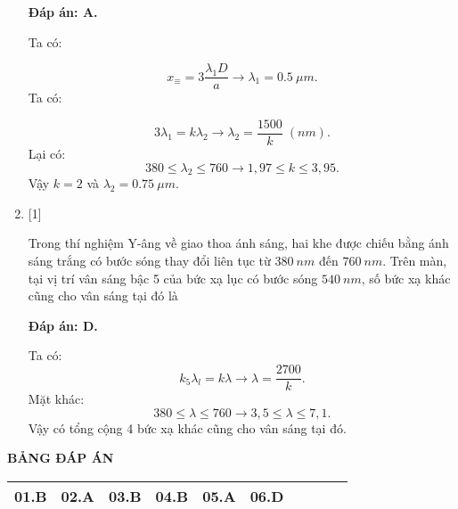 \begin{enumerate}[label=\bfseries Câu \arabic*:]
\loigiai
{		\textbf{Đáp án: A.}
	
	Ta có:
	
	$$
	x_{\equiv} = 3 \dfrac{\lambda_{1} D}{a} \rightarrow \lambda_{1} = \SI{0,5}{\mu m}.
	$$
	Ta có:
	
	$$
	3 \lambda_{1} = k \lambda_{2} \rightarrow \lambda_{2} = \dfrac{1500}{k} \; (\si{nm}).
	$$
	Lại có:
	$$
	380 \leq \lambda_{2} \leq 760 \rightarrow 1,97 \leq k \leq 3,95.
	$$
	Vậy $k = 2$ và $\lambda_{2} = \SI{0,75}{\mu m}$.
}   
	
\item {} [1]

\cauhoi
{Trong thí nghiệm Y-âng về giao thoa ánh sáng, hai khe được chiếu bằng ánh sáng trắng có bước sóng thay đổi liên tục từ $\SI{380}{nm}$ đến $\SI{760}{nm}$. Trên màn, tại vị trí vân sáng bậc 5 của bức xạ lục có bước sóng $\SI{540}{nm}$, số bức xạ khác cũng cho vân sáng tại đó là
}

\loigiai
{		\textbf{Đáp án: D.}
	
	Ta có:
	$$
	k_{5}\lambda_{l} = k \lambda \rightarrow \lambda = \dfrac{2700}{k} .
	$$
	Mặt khác:
	$$
	380 \leq \lambda \leq 760 \rightarrow 3,5 \leq \lambda \leq 7,1.
	$$
	Vậy có tổng cộng 4 bức xạ khác cũng cho vân sáng tại đó.
}

	
\end{enumerate}

\loigiai
{
	\begin{center}
		\textbf{BẢNG ĐÁP ÁN}
	\end{center}
	\begin{center}
		\begin{tabular}{|m{2.8em}|m{2.8em}|m{2.8em}|m{2.8em}|m{2.8em}|m{2.8em}|m{2.8em}|m{2.8em}|m{2.8em}|m{2.8em}|}
			\hline
			01.B  & 02.A  & 03.B  & 04.B  & 05.A  & 06.D  & &  &  &  \\
			\hline
			
		\end{tabular}
	\end{center}
}

\whiteBGstarEnd
